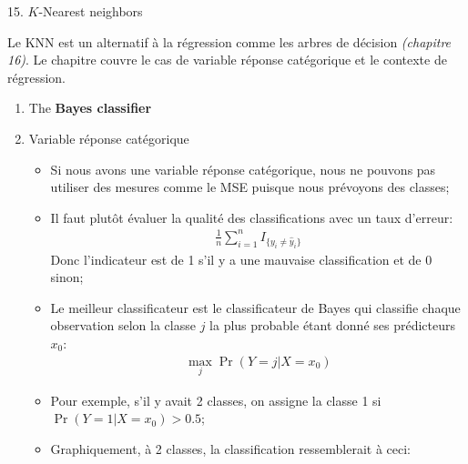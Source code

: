 \documentclass[12pt, titlepage, french]{report}
\begin{document}
\begin{CHPT_SUMM}[label = {PCA-KNN}]{15. $K$-Nearest neighbors}
Le KNN est un alternatif à la régression comme les arbres de décision \textit{(chapitre 16)}. Le chapitre couvre le cas de variable réponse catégorique et le contexte de régression.
\begin{enumerate}
	\item	The \textbf{Bayes classifier}
	\item[]	Variable réponse catégorique
	\begin{itemize}
		\item	Si nous avons une variable réponse catégorique, nous ne pouvons pas utiliser des mesures comme le MSE puisque nous prévoyons des classes;
		\item	Il faut plutôt évaluer la qualité des classifications avec un taux d'erreur:
			\begin{align*}
			\frac{1}{n} \sum_{i = 1}^{n} I_{\{y_{i} \neq \hat{y}_{i} \}}
			\end{align*}
				Donc l'indicateur est de 1 s'il y a une mauvaise classification et de 0 sinon;
		\item	Le meilleur classificateur est le classificateur de Bayes qui classifie chaque observation selon la classe $j$ la plus probable étant donné ses prédicteurs $x_{0}$:
			\begin{align*}
			\underset{j}{\max} \Pr(Y = j | X = x_{0})
			\end{align*}
		\item	Pour exemple, s'il y avait 2 classes, on assigne la classe 1 si $\Pr( Y = 1 | X = x_{0}) > 0.5$;
		\item	Graphiquement, à 2 classes, la classification ressemblerait à ceci:
		

\end{itemize}
\end{enumerate}
\end{CHPT_SUMM}
\end{document}
